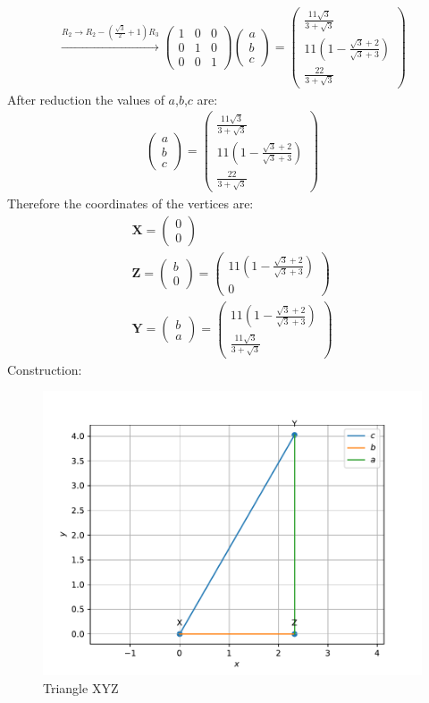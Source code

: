 \documentclass{article}
\newcommand{\myvec}[1]{\ensuremath{\begin{pmatrix}#1\end{pmatrix}}}
\let\vec\mathbf
\begin{document}
\begin{align}
	 \xrightarrow[]{R_2 \rightarrow R_2-(\frac{\sqrt{3}}{2}+1)R_3}\myvec{1 & 0 & 0 \\ 0 & 1 & 0\\0 &  0 & 1}\myvec{a \\ b \\ c}= \myvec{\frac{11\sqrt{3}}{3+\sqrt{3}} \\ 11(1-\frac{\sqrt{3}+2}{\sqrt{3}+3}) \\\frac{22}{3+\sqrt{3}}}
 \end{align}
 After reduction the values of $a$,$b$,$c$ are:
 \begin{align}
     \myvec{a \\ b \\ c}=\myvec{\frac{11\sqrt{3}}{3+\sqrt{3}} \\ 11(1-\frac{\sqrt{3}+2}{\sqrt{3}+3}) \\\frac{22}{3+\sqrt{3}}}
 \end{align}
 Therefore the coordinates of the vertices are:
 \begin{align}
      \vec{X}=\myvec{0\\0}\\
      \vec{Z}=\myvec{b \\ 0}=\myvec{11(1-\frac{\sqrt{3}+2}{\sqrt{3}+3}) \\ 0}\\                                               
      \vec{Y}=\myvec{b \\ a}=\myvec{11(1-\frac{\sqrt{3}+2}{\sqrt{3}+3}) \\ \frac{11\sqrt{3}}{3+\sqrt{3}} }
 \end{align}
 Construction:\\
 \begin{figure}[h]
	 \begin{center}
		 \includegraphics[width=\columnwidth]{code(m)/fig.pdf}
	 \end{center}
	 \caption{Triangle XYZ}
	 \label{fig:Fig1}
 \end{figure}
\end{document}
